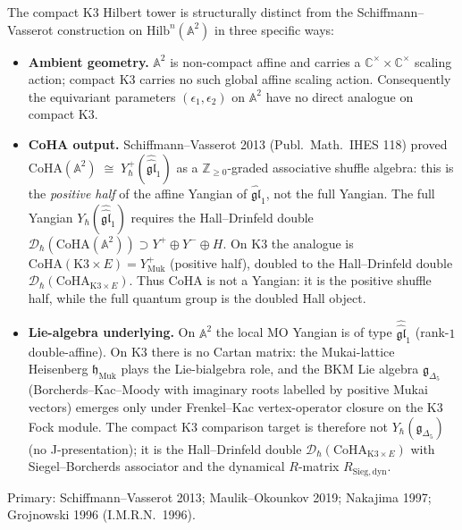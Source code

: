 \begin{remark}
\label{rem:msco-K3-hilb-vs-A2}
The compact K3 Hilbert tower is structurally distinct from the
Schiffmann--Vasserot construction on
$\mathrm{Hilb}^n(\mathbb{A}^2)$ in three specific ways:
\begin{itemize}
\item \textbf{Ambient geometry.} $\mathbb A^2$ is non-compact affine
 and carries a $\mathbb C^\times \times \mathbb C^\times$ scaling
 action; compact $\mathrm{K3}$ carries no such global affine scaling
 action. Consequently the equivariant parameters
 $(\epsilon_1, \epsilon_2)$ on $\mathbb A^2$ have no direct analogue
 on compact $\mathrm{K3}$.
\item \textbf{CoHA output.} Schiffmann--Vasserot 2013 (Publ.~Math.~IHES
 118) proved
 $\mathrm{CoHA}(\mathbb{A}^2) \;\cong\; Y^+_\hbar(\widehat{\widehat{\mathfrak{gl}}}_1)$
 as a $\mathbb{Z}_{\ge 0}$-graded associative shuffle algebra: this
 is the \emph{positive half} of the affine Yangian of
 $\widehat{\mathfrak{gl}}_1$, not the full Yangian. The full Yangian
 $Y_\hbar(\widehat{\widehat{\mathfrak{gl}}}_1)$ requires the
 Hall--Drinfeld double
 $\mathcal{D}_\hbar(\mathrm{CoHA}(\mathbb{A}^2)) \supset Y^+ \oplus Y^-
 \oplus H$. On $\mathrm K3$ the analogue is
 $\mathrm{CoHA}(\mathrm{K3} \times E) = Y^+_{\mathrm{Muk}}$ (positive
 half), doubled to the Hall--Drinfeld double
 $\mathcal{D}_\hbar(\mathrm{CoHA}_{\mathrm{K3} \times E})$.
 Thus $\mathrm{CoHA}$ is not a Yangian: it is the positive shuffle
 half, while the full quantum group is the doubled Hall object.
\item \textbf{Lie-algebra underlying.} On $\mathbb A^2$ the local MO Yangian
 is of type $\widehat{\widehat{\mathfrak{gl}}}_1$ (rank-$1$
 double-affine). On $\mathrm K3$ there is no Cartan matrix: the
 Mukai-lattice Heisenberg $\mathfrak{h}_{\mathrm{Muk}}$ plays the
 Lie-bialgebra role, and the BKM Lie algebra
 $\mathfrak{g}_{\Delta_5}$ (Borcherds--Kac--Moody with imaginary
 roots labelled by positive Mukai vectors) emerges only under
 Frenkel--Kac vertex-operator closure on the K3 Fock module. The
 compact K3 comparison target is therefore not
 $Y_\hbar(\mathfrak{g}_{\Delta_5})$ (no J-presentation); it is the Hall--Drinfeld
 double $\mathcal{D}_\hbar(\mathrm{CoHA}_{\mathrm{K3} \times E})$
 with Siegel--Borcherds associator and the dynamical $R$-matrix
 $R_{\mathrm{Sieg,dyn}}$.
\end{itemize}
Primary: Schiffmann--Vasserot 2013; Maulik--Okounkov 2019; Nakajima
1997; Grojnowski 1996 (I.M.R.N.~1996).
\end{remark}

